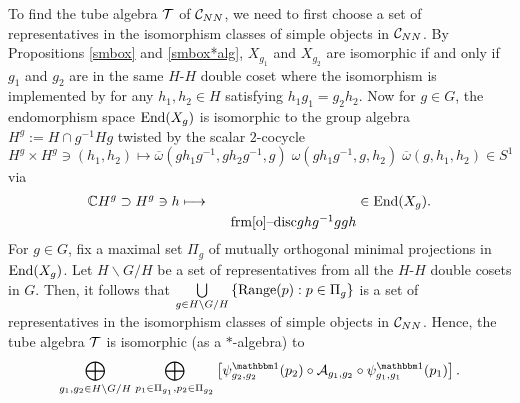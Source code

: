 \begin{rem}
To find the tube algebra $ \mathcal T $ of $ \mathcal C_{NN} $, we need to first choose a set of representatives in the isomorphism classes of simple objects in $ \mathcal C_{NN} $.
By Propositions \ref{smbox} and \ref{smbox*alg}, $ X_{g_1} $ and $ X_{g_2} $ are isomorphic if and only if $ g_1 $ and $ g_2 $ are in the same $ H $-$ H $ double coset where the isomorphism is implemented by  for any $ h_1, h_2 \in H $ satisfying $h_1 g_1 = g_2 h_2$.
Now for $ g\in G $, the endomorphism space $ \text{End} (X_g) $ is isomorphic to the group algebra $ H^g := H \cap g^{-1} H g $ twisted by the scalar $ 2 $-cocycle $ H^g \times H^g  \ni (h_1 , h_2) \mapsto \overline{\omega} (g h_1 g^{-1}, g h_2 g^{-1}, g) \; \omega (g h_1 g^{-1} , g , h_2) \; \overline{\omega} (g , h_1, h_2) \in S^1$ via
\[
\C H^g \supset H^g \ni h \longmapsto \hspace{1.5em} \raisebox{-1.5 em}{\1disc{$ g h g^{-1} $}{$ g $}{$ g $}{$ h $}} \in \t {End} (X_g).
\]
For $ g \in G $, fix a maximal set $ \Pi_g $ of mutually orthogonal minimal projections in $ \text{End} (X_g) $.
Let $ H \backslash G / H $ be a set of representatives from all the $ H $-$ H $ double cosets in $ G $.
Then, it follows that%
$ \underset{g \in  H \backslash G / H }{\bigcup}  \left\{  \text{Range} (p) : p \in  \Pi_g \right\}$ is a set of representatives in the isomorphism classes of simple objects in $ \mathcal C_{NN} $.
Hence, the tube algebra $ \mathcal T $ is isomorphic (as a $ * $-algebra) to
\[
\us {g_1 , g_2 \in H \backslash G / H}  \bigoplus \;\us {p_1 \in \Pi_{g_1}, p_2 \in \Pi_{g_2}}  \bigoplus \left[\psi^{\mathbbm 1}_{g_2,g_2} (p_2) \circ
{\mcal A}_{g_1,g_2} \circ \psi^{\mathbbm 1}_{g_1,g_1} (p_1)\right].
\]
\end{rem}
